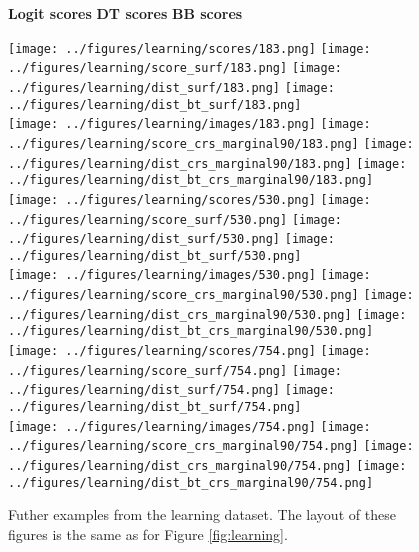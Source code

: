 \begin{figure}
\hspace{4.3cm} {\fontsize{11pt}{13pt}\selectfont \textbf{Logit scores}} \hspace{1.2cm} 
{\fontsize{11pt}{13pt}\selectfont \textbf{DT scores}} \hspace{1.3cm} 
{\fontsize{11pt}{13pt}\selectfont \textbf{BB scores}}
	\begin{center}
		\texttt{[image: ../figures/learning/scores/183.png]}
		\texttt{[image: ../figures/learning/score\_surf/183.png]}	\texttt{[image: ../figures/learning/dist\_surf/183.png]}
		\texttt{[image: ../figures/learning/dist\_bt\_surf/183.png]}\\
		\texttt{[image: ../figures/learning/images/183.png]}
		\texttt{[image: ../figures/learning/score\_crs\_marginal90/183.png]}
		\texttt{[image: ../figures/learning/dist\_crs\_marginal90/183.png]}
		\texttt{[image: ../figures/learning/dist\_bt\_crs\_marginal90/183.png]}\\
		\vspace{0.5cm}
		\texttt{[image: ../figures/learning/scores/530.png]}
		\texttt{[image: ../figures/learning/score\_surf/530.png]}	\texttt{[image: ../figures/learning/dist\_surf/530.png]}
		\texttt{[image: ../figures/learning/dist\_bt\_surf/530.png]}\\
		\texttt{[image: ../figures/learning/images/530.png]}
		\texttt{[image: ../figures/learning/score\_crs\_marginal90/530.png]}
		\texttt{[image: ../figures/learning/dist\_crs\_marginal90/530.png]}
		\texttt{[image: ../figures/learning/dist\_bt\_crs\_marginal90/530.png]}\\
		\vspace{0.5cm}
		\texttt{[image: ../figures/learning/scores/754.png]}
		\texttt{[image: ../figures/learning/score\_surf/754.png]}	\texttt{[image: ../figures/learning/dist\_surf/754.png]}
		\texttt{[image: ../figures/learning/dist\_bt\_surf/754.png]}\\
		\texttt{[image: ../figures/learning/images/754.png]}
		\texttt{[image: ../figures/learning/score\_crs\_marginal90/754.png]}
		\texttt{[image: ../figures/learning/dist\_crs\_marginal90/754.png]}
		\texttt{[image: ../figures/learning/dist\_bt\_crs\_marginal90/754.png]}
	\end{center}
	\caption{Futher examples from the learning dataset. The layout of these figures is the same as for Figure \ref{fig:learning}.}
	\label{fig:learning3}
\end{figure}

